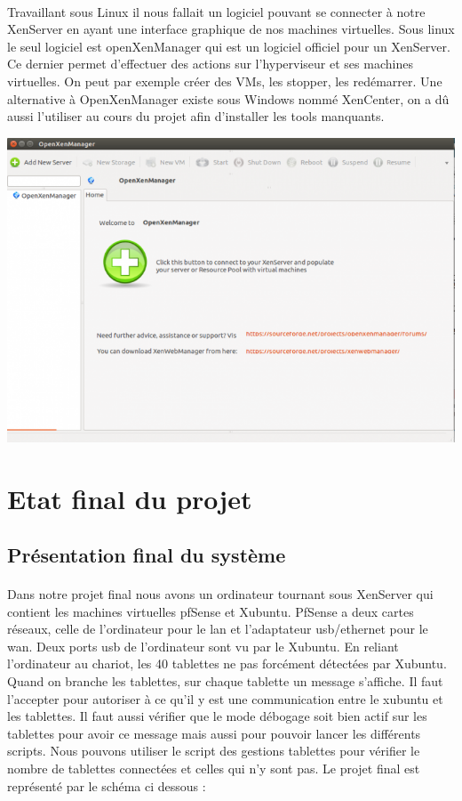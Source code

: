 \documentclass[a4paper,12pt]{extarticle}
\begin{document}
\paragraph{}
Travaillant sous Linux il nous fallait un logiciel pouvant se connecter à notre XenServer en ayant une interface graphique de nos machines virtuelles. Sous linux le seul logiciel est openXenManager qui est un logiciel officiel pour un XenServer. Ce dernier permet d’effectuer des actions sur l’hyperviseur et ses machines virtuelles. 
On peut par exemple créer des VMs, les stopper, les redémarrer. Une alternative à OpenXenManager existe sous Windows nommé XenCenter, on a dû aussi l’utiliser au cours du projet afin d’installer les tools manquants.

\begin{center}
\includegraphics[scale=0.70]{openxenmanager}
\end{center}

\section{Etat final du projet}
\subsection{Présentation final du système}

\paragraph{}
Dans notre projet final nous avons un ordinateur tournant sous XenServer qui contient les machines virtuelles pfSense et Xubuntu. PfSense a deux cartes réseaux, celle de l’ordinateur pour le lan et l’adaptateur usb/ethernet pour le wan. Deux ports usb de l’ordinateur sont vu par le Xubuntu. En reliant l’ordinateur au chariot, les 40 tablettes ne pas forcément détectées par Xubuntu. Quand on branche les tablettes, sur chaque tablette un message s’affiche. 
Il faut l’accepter pour autoriser à ce qu’il y est une communication entre le xubuntu et les tablettes. Il faut aussi vérifier que le mode débogage soit bien actif sur les tablettes pour avoir ce message mais aussi pour pouvoir lancer les différents scripts. Nous pouvons utiliser le script des gestions tablettes pour vérifier le nombre de tablettes connectées et celles qui n’y sont pas. 
Le projet final est représenté par le schéma ci dessous :
\end{document}
